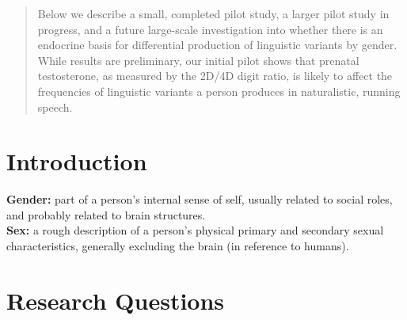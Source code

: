 \documentclass[a0,portrait]{a0poster}
\begin{document}
\begin{multicols}{2} %


\color{Navy} %

\begin{abstract}

Below we describe a small, completed pilot study, a larger pilot study in progress, and a future large-scale investigation into whether there is an endocrine basis for differential production of linguistic variants by gender. While results are preliminary, our initial pilot shows that prenatal testosterone, as measured by the 2D/4D digit ratio, is likely to affect the frequencies of linguistic variants a person produces in naturalistic, running speech.

\end{abstract}


\color{SaddleBrown} %

\section*{Introduction}


\textbf{Gender:} part of a person's internal sense of self, usually related to social roles, and probably related to brain structures.\\
\textbf{Sex:} a rough description of a person's physical primary and secondary sexual characteristics, generally excluding the brain (in reference to humans).



\color{DarkSlateGray} %

\section*{Research Questions}



\end{multicols}
\end{document}
